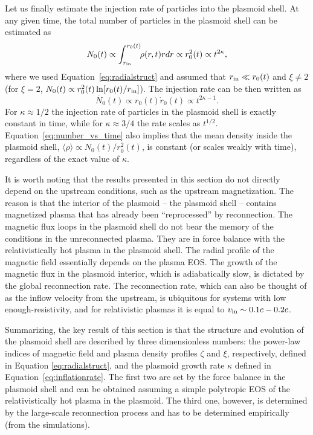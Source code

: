 Let us finally estimate the injection rate of particles into the plasmoid shell. At any given time, the total number of particles in the plasmoid shell can be estimated as 
\begin{equation}
    \label{eq:number_vs_time}
    N_0(t)\propto \int_{r_{\rm in}}^{r_0(t)} \! \! \rho(r, t) rdr \propto r^2_0(t) \propto t^{2\kappa},
\end{equation}
where we used Equation~\eqref{eq:radialstruct} and assumed that $r_{\rm in} \ll r_0(t)$ and $\xi \ne 2$ (for $\xi=2$, $N_0(t) \propto r^2_0(t) \ln [r_0(t)/r_{\rm in}]$). The injection rate can be then written as
\begin{equation}
    \label{eq:injrate}
    \dot{N_0}(t)\propto r_0(t)\dot{r}_0(t)\propto t^{2\kappa-1}.
\end{equation}
For $\kappa\approx 1/2$ the injection rate of particles in the plasmoid shell is exactly constant in time, while for $\kappa\approx 3/4$ the rate scales as $t^{1/2}$. Equation~\eqref{eq:number_vs_time} also implies that the mean density inside the plasmoid shell, $\langle\rho\rangle \propto N_0(t)/r^2_0(t)$, is constant (or scales weakly with time), regardless of the exact value of $\kappa$.  

It is worth noting that the results presented in this section do not directly depend on the upstream conditions, such as the upstream magnetization. The reason is that the interior of the plasmoid -- the plasmoid shell -- contains magnetized plasma that has already been ``reprocessed'' by reconnection. The magnetic flux loops in the plasmoid shell do not bear the memory of the conditions in the unreconnected plasma. They are in force balance with the relativistically hot plasma in the plasmoid shell. The radial profile of the magnetic field essentially depends on the plasma EOS. The growth of the magnetic flux in the plasmoid interior, which is adiabatically slow, is dictated by the global reconnection rate. The reconnection rate, which can also be thought of as the inflow velocity from the upstream, is ubiquitous for systems with low enough-resistivity, and for relativistic plasmas it is equal to $v_{\rm in}\sim 0.1c-0.2c$. 

Summarizing, the key result of this section is that the structure and evolution of the plasmoid shell are described by three dimensionless numbers: the power-law indices of magnetic field and plasma density profiles $\zeta$ and $\xi$, respectively, defined in Equation \eqref{eq:radialstruct}, and the plasmoid growth rate $\kappa$ defined in Equation~\eqref{eq:inflationrate}. The first two are set by the force balance in the plasmoid shell and can be obtained assuming a simple polytropic EOS of the relativistically hot plasma in the plasmoid. The third one, however, is determined by the large-scale reconnection process and has to be determined empirically (from the simulations).

